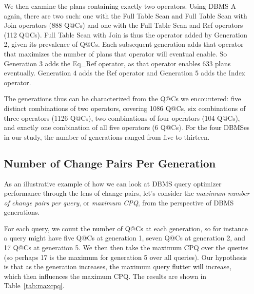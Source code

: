 \documentclass[prodmode,acmtods]{acmsmall}
\begin{document}
We then examine the plans containing exactly two operators.
Using DBMS A again, there are two such: one with the Full Table Scan and
Full Table Scan with Join operators (888 Q@Cs) and
one with the Full Table Scan and Ref operators (112 Q@Cs). Full
Table Scan with Join is thus the operator added by Generation 2, given its
prevalence of Q@Cs. Each
subsequent generation adds that operator that maximizes the number of plans
that operator will eventual enable. So Generation 3 adds the Eq\_Ref operator,
as that operator enables 633 plans eventually. Generation 4 adds the Ref
operator and Generation 5 adds the Index operator. 

The generations thus can be characterized from the Q@Cs we encountered: five distinct combinations of two
operators, covering 1086 Q@Cs, six combinations of three operators (1126 Q@Cs),
two combinations of four operators (104 Q@Cs), and exactly one
combination of all five operators (6 Q@Cs).
For the four \hbox{DBMSes} in our study, the number of generations ranged from five
to thirteen. 

\subsection{Number of Change Pairs Per Generation}\label{sec:CPQ}
As an illustrative example of how we can look at DBMS query optimizer
performance through the lens of change pairs, let's consider  the {\em
  maximum number of change pairs per query}, or {\em maximum CPQ}, from the
perspective of
\hbox{DBMS} generations.

For each query, we count the number of Q@Cs at each
generation, so for instance a query might have five Q@Cs at generation 1, seven Q@Cs at
generation 2, and 17 Q@Cs at generation 5. We then then take the maximum CPQ
over the queries (so perhaps 17 is the maximum for generation 5 over all
queries). Our hypothesis is that as the generation increases, the maximum
query flutter will increase, which then influences the maximum CPQ. The results are shown in Table~\ref{tab:maxcpq}.
\end{document}
